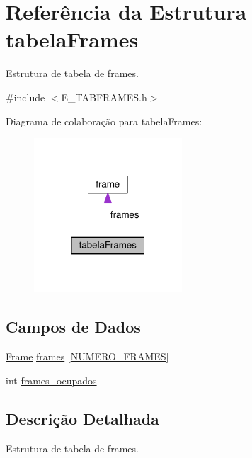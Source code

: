 \hypertarget{structtabela_frames}{}\section{Referência da Estrutura tabela\+Frames}
\label{structtabela_frames}


Estrutura de tabela de frames.  




{\ttfamily \#include $<$E\+\_\+\+T\+A\+B\+F\+R\+A\+M\+E\+S.\+h$>$}



Diagrama de colaboração para tabela\+Frames\+:\nopagebreak
\begin{figure}[H]
\begin{center}
\leavevmode
\includegraphics[width=157pt]{structtabela_frames__coll__graph}
\end{center}
\end{figure}
\subsection*{Campos de Dados}
\begin{DoxyCompactItemize}
\item 
\hyperlink{_e___t_a_b_f_r_a_m_e_s_8h_ace44f6be19bb7b3e2e0179d40ff7183b}{Frame} \hyperlink{structtabela_frames_aac0c8dc35d3f4adf6ea85a58e6dd5b1b}{frames} \mbox{[}\hyperlink{_e___t_a_b_f_r_a_m_e_s_8h_adebc67ff3f65237e9bfddd02e9330de8}{N\+U\+M\+E\+R\+O\+\_\+\+F\+R\+A\+M\+E\+S}\mbox{]}
\item 
int \hyperlink{structtabela_frames_a553bdd652583501262efcc7ecdea074a}{frames\+\_\+ocupados}
\end{DoxyCompactItemize}


\subsection{Descrição Detalhada}
Estrutura de tabela de frames. 

